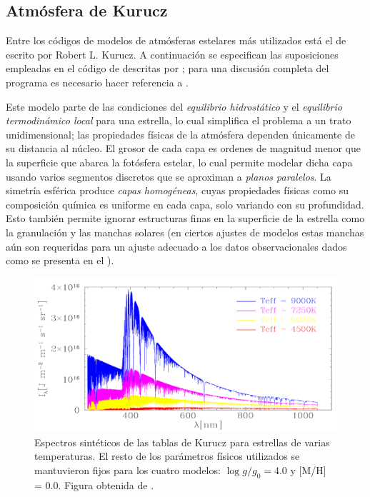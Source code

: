 \subsection{Atmósfera de Kurucz}

Entre los códigos de modelos de atmósferas estelares más utilizados está el de
 escrito por Robert L. Kurucz. A continuación se especifican las
suposiciones empleadas en el código de  descritas por
; para una discusión completa
del programa es necesario hacer referencia a .

Este modelo parte de las condiciones del \textit{equilibrio hidrostático} y el
\textit{equilibrio termodinámico local} para una estrella, lo cual simplifica el
problema a un trato unidimensional; las propiedades físicas de la atmósfera
dependen únicamente de su distancia al núcleo. El grosor de cada capa es ordenes
de magnitud menor que la superficie que abarca la fotósfera estelar, lo cual
permite modelar dicha capa usando varios segmentos discretos que se aproximan a
\textit{planos paralelos}. La simetría esférica produce \textit{capas
homogéneas}, cuyas propiedades físicas como su composición química es uniforme
en cada capa, solo variando con su profundidad. Esto también permite ignorar
estructuras finas en la superficie de la estrella como la granulación y las
manchas solares (en ciertos ajustes de modelos estas manchas aún son requeridas
para un ajuste adecuado a los datos observacionales dados como se presenta en el
). 

\begin{figure}[!ht]
	\centering
	\includegraphics[scale=0.29]{Introduccion/Figures/Figura Kurucz_PHOEBE Reference.png}
	\caption{Espectros sintéticos de las tablas de Kurucz para estrellas de
	varias temperaturas. El resto de los parámetros físicos utilizados se
	mantuvieron fijos para los cuatro modelos: $\log{g/g_0} = 4.0$ y [M/H] =
	0.0. Figura obtenida de .}
	\label{figuraKuruczEspectro}
\end{figure}

